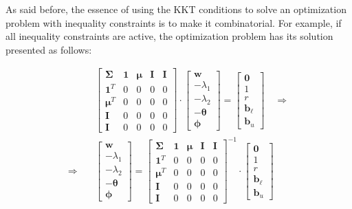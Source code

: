 \documentclass{beamer}
\begin{document}
\begin{frame}

\justifying
As said before, the essence of using the KKT conditions to solve an optimization problem with inequality constraints is to make it combinatorial. For example, if all inequality constraints are active, the optimization problem has its solution presented as follows:

\justifying
\begin{equation*}
\begin{aligned}
	& \begin{bmatrix}
		\mathbf{\Sigma} & \mathbf{1} & \boldsymbol\mu & \mathbf{I} & \mathbf{I} \\
		\mathbf{1}^{T} & 0 & 0 & 0 & 0 \\
		\boldsymbol\mu^{T} & 0 & 0 & 0 & 0 \\
		\mathbf{I} & 0 & 0 & 0 & 0 \\
		\mathbf{I} & 0 & 0 & 0 & 0
	   \end{bmatrix}
	   \cdot
	   \begin{bmatrix}
	   	\mathbf{w} \\
		-\lambda_{1} \\
		-\lambda_{2} \\
		-\boldsymbol\theta \\
		\boldsymbol\phi
	  \end{bmatrix}
	  =
	  \begin{bmatrix}
	  	\mathbf{0} \\ 
		1 \\
		r \\
		\mathbf{b}_{\ell} \\
		\mathbf{b}_{u}
	\end{bmatrix}
	\quad \Rightarrow \\
	\Rightarrow \quad &
	\begin{bmatrix}
	   	\mathbf{w} \\
		-\lambda_{1} \\
		-\lambda_{2} \\
		-\boldsymbol\theta \\
		\boldsymbol\phi
	  \end{bmatrix}
	  =
	  \begin{bmatrix}
		\mathbf{\Sigma} & \mathbf{1} & \boldsymbol\mu & \mathbf{I} & \mathbf{I} \\
		\mathbf{1}^{T} & 0 & 0 & 0 & 0 \\
		\boldsymbol\mu^{T} & 0 & 0 & 0 & 0 \\
		\mathbf{I} & 0 & 0 & 0 & 0 \\
		\mathbf{I} & 0 & 0 & 0 & 0
	   \end{bmatrix}^{-1}
	   \cdot
	  \begin{bmatrix}
	  	\mathbf{0} \\ 
		1 \\
		r \\
		\mathbf{b}_{\ell} \\
		\mathbf{b}_{u}
	\end{bmatrix}
\end{aligned}
\end{equation*}


\end{frame}
\end{document}
